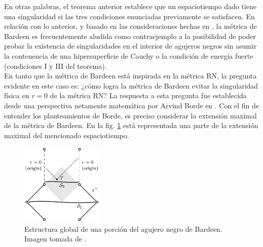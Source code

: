 \documentclass[16pt,a4paper]{article}
\numberwithin{equation}{section}
\theoremstyle{definition}
\begin{document}
En otras palabras, el teorema anterior establece que un espaciotiempo dado tiene una singularidad si las tres condiciones enunciadas previamente se satisfacen. En relación con lo anterior, y basado en las consideraciones hechas en \cite{borde1994,borde1996}, la métrica de Bardeen es frecuentemente aludida como contraejemplo a la posibilidad de poder probar la existencia de singularidades en el interior de agujeros negros sin asumir la contenencia de una hipersuperficie de Cauchy o la condición de energía fuerte (condiciones I y III del teorema).\\

En tanto que la métrica de Bardeen está inspirada en la métrica RN, la pregunta evidente en este caso es: ¿cómo logra la métrica de Bardeen evitar la singularidad física en $r = 0$ de la métrica RN? La respuesta a esta pregunta fue establecida desde una perspectiva netamente matemática por Arvind Borde en \cite{borde1994,borde1996}. Con el fin de entender los planteamientos de Borde, es preciso considerar la extensión maximal de la métrica de Bardeen. En la fig. \ref{fig: bardeen diagram} está representada una parte de la extensión maximal del mencionado espaciotiempo.\\

\begin{figure}[h!]
	\centering
	\includegraphics[width=0.35\textwidth]{bardeenDiagram}
	\caption{Estructura global de una porción del agujero negro de Bardeen. Imagen tomada de \cite{borde1994}.}
	\label{fig: bardeen diagram}
\end{figure}
\end{document}
